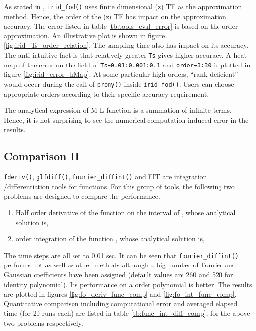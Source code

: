 \documentclass[11pt]{tCON2e}
\theoremstyle{plain}\newtheorem{theorem}{Theorem}
\theoremstyle{definition}
\theoremstyle{remark}
\begin{document}
As stated in \cite{ref:Chen_irid_fod}, {\tt irid\_fod()} uses finite dimensional (z) TF as the approximation method. Hence, the order of the (z) TF has impact on the approximation accuracy. The error listed in table \ref{tb:tools_eval_error} is based on the  order approximation. An illustrative plot is shown in figure \ref{fig:irid_Ts_order_relation}. The sampling time also has impact on its accuracy. The anti-intuitive fact is that relatively greater {\tt Ts} gives higher accuracy. A heat map of the error on the field of {\tt Ts=0.01:0.001:0.1} and {\tt order=3:30} is plotted in figure \ref{fig:irid_error_hMap}. At some particular high orders, ``rank deficient'' would occur during the call of {\tt prony()} inside {\tt irid\_fod()}. Users can choose appropriate orders according to their specific accuracy requirement.




The analytical expression of M-L function is a summation of infinite terms. Hence, it is not surprising to see the numerical computation induced error in the results.




\subsection{Comparison II}

{\tt fderiv()}, {\tt glfdiff()}, {\tt fourier\_diffint()} and FIT are integration /differentiation tools for functions. For this group of tools, the following two problems are designed to compare the performance.
\begin{enumerate}
    \item Half order derivative of the function  on the interval of , whose analytical solution is,
    
    \item  order integration of the function , whose analytical solution is,
    
\end{enumerate}

The time steps are all set to 0.01 sec. It can be seen that {\tt fourier\_diffint()} performs not as well as other methods although a big number of Fourier and Gaussian coefficients have been assigned (default values are 260 and 520 for identity polynomial). Its performance on a  order polynomial is better. The results are plotted in figures \ref{fig:fo_deriv_func_comp} and \ref{fig:fo_int_func_comp}. Quantitative comparison including computational error and averaged elapsed time (for 20 runs each) are listed in table \ref{tb:func_int_diff_comp}, for the above two problems respectively.
\end{document}
